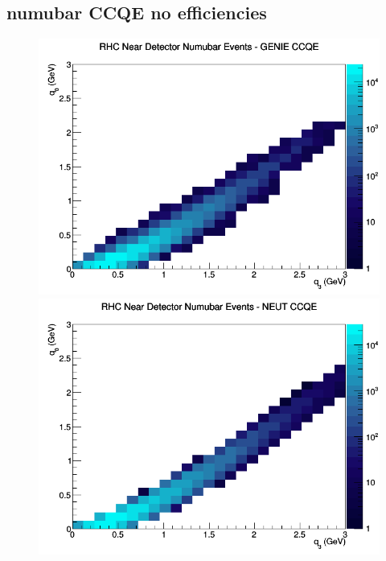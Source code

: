 \subsection{numubar CCQE no efficiencies}
\begin{figure}[h]
\includegraphics[width=\linewidth]{q0_q3/nominal/CCQE_RHC_ND_numubar_q3_q0_GENIE.png}
\endminipage
{}
\includegraphics[width=\linewidth]{q0_q3/nominal/CCQE_RHC_ND_numubar_q3_q0_NEUT.png}
\endminipage
{}

\end{figure}
